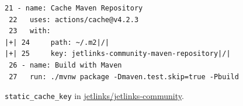 \begin{figure}[htbp]
\centering
\begin{lstlisting}[style=ccscase,aboveskip=2pt,belowskip=3pt]
 21 - name: Cache Maven Repository
 22   uses: actions/cache@v4.2.3
 23   with:
|+| 24     path: ~/.m2|/|
|+| 25     key: jetlinks-community-maven-repository|/|
 26 - name: Build with Maven
 27   run: ./mvnw package -Dmaven.test.skip=true -Pbuild
\end{lstlisting}
\caption{\texttt{static\_cache\_key} in \href{https://github.com/jetlinks/jetlinks-community/blob/bb6e8a93ccbbb7fd91711a75c36d69472d5c2964/.github/workflows/pull_request.yml}{jetlinks/jetlinks-community}.}
\label{fig:ccs-static-key-code}
\end{figure}
